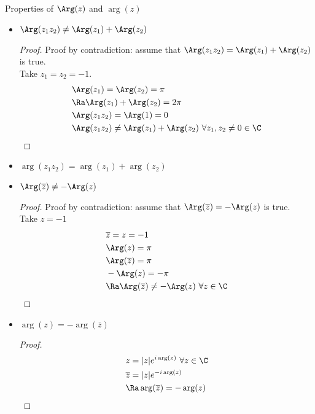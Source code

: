 Properties of $\Arg(z)$ and $\arg(z)$
\begin{itemize}
    \item $\Arg(z_1z_2)\neq\Arg(z_1)+\Arg(z_2)$
\begin{proof}
Proof by contradiction: assume that $\Arg(z_1z_2)=\Arg(z_1)+\Arg(z_2)$ is true.\\
Take $z_1=z_2=-1$.
\begin{align*}
    &\Arg(z_1)=\Arg(z_2)=\pi\\
    &\Ra \Arg(z_1)+\Arg(z_2)=2\pi\\
    &\Arg(z_1z_2)=\Arg(1)=0\\
    &\Arg(z_1z_2)\neq\Arg(z_1)+\Arg(z_2)\ \forall z_1,z_2\neq0\in\C
\end{align*}
\end{proof}
\item $\arg(z_1z_2)=\arg(z_1)+\arg(z_2)$
\item $ \Arg(\overline{z})\neq-\Arg(z) $
\begin{proof}
Proof by contradiction: assume that $\Arg(\overline{z})=-\Arg(z)$ is true.\\
Take $z=-1$
\begin{align*}
    &\overline{z}=z=-1\\
    &\Arg(z)=\pi\\
    &\Arg(\overline{z})=\pi\\
    &-\Arg(z)=-\pi\\
    &\Ra \Arg(\overline{z})\neq-\Arg(z)\ \forall z\in\C
\end{align*}
\end{proof}
\item $ \arg(z)=-\arg(\overline{z}) $
\begin{proof}
\begin{align*}
    &z=|z|e^{i\arg(z)}\ \forall z\in\C\\
    &\overline{z}=|z|e^{-i\arg(z)}\\
    &\Ra \arg(\overline{z})=-\arg(z)
\end{align*}
\end{proof}
\end{itemize}